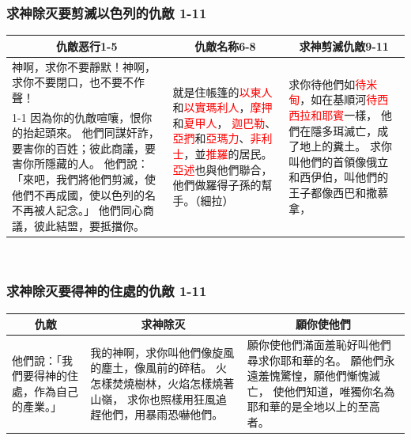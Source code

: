 \subsubsection{求神除灭要剪滅以色列的仇敵 1-11}
\begin{table}[H]
\centering
\begin{tabular}{p{8.5cm}|p{4.2500cm}|p{4.50cm}}\hline\hline
\multicolumn{1}{c|}{仇敵恶行1-5}&\multicolumn{1}{c|}{仇敵名称6-8}&\multicolumn{1}{c}{求神剪滅仇敵9-11}\\\hline
神啊，求你不要靜默！神啊，求你不要閉口，也不要不作聲！
&\multirow{2}{4.4cm}{就是住帳篷的\textcolor{red}{以東人}和\textcolor{red}{以實瑪利人}，\textcolor{red}{摩押}和\textcolor{red}{夏甲人}，
\textcolor{red}{迦巴勒}、\textcolor{red}{亞捫}和\textcolor{red}{亞瑪力}、\textcolor{red}{非利士}，並\textcolor{red}{推羅}的居民。
\textcolor{red}{亞述}也與他們聯合，他們做羅得子孫的幫手。（細拉）}
&\multirow{2}{4.4cm}{求你待他們如\textcolor{red}{待米甸}，如在基順河\textcolor{red}{待西西拉和耶賓}一樣，
他們在隱多珥滅亡，成了地上的糞土。
求你叫他們的首領像俄立和西伊伯，叫他們的王子都像西巴和撒慕拿，}\\\cline{1-1}
因為你的仇敵喧嚷，恨你的抬起頭來。
他們同謀奸詐，要害你的百姓；彼此商議，要害你所隱藏的人。
他們說：「來吧，我們將他們剪滅，使他們不再成國，使以色列的名不再被人記念。」
他們同心商議，彼此結盟，要抵擋你。&&\\\hline
\end{tabular}
\end{table} 

\subsubsection{求神除灭要得神的住處的仇敵 1-11}
\begin{table}[H]
\centering
\begin{tabular}{p{2.5cm}|p{7.300cm}|p{7.7cm}}\hline\hline
\multicolumn{1}{c|}{仇敵}&\multicolumn{1}{c|}{求神除灭}&\multicolumn{1}{c}{願你使他們}\\\hline
他們說：「我們要得神的住處，作為自己的產業。」
&我的神啊，求你叫他們像旋風的塵土，像風前的碎秸。
火怎樣焚燒樹林，火焰怎樣燒著山嶺，
求你也照樣用狂風追趕他們，用暴雨恐嚇他們。
&願你使他們滿面羞恥好叫他們尋求你耶和華的名。
願他們永遠羞愧驚惶，願他們慚愧滅亡，
使他們知道，唯獨你名為耶和華的是全地以上的至高者。\\\hline
\end{tabular}
\end{table} 


